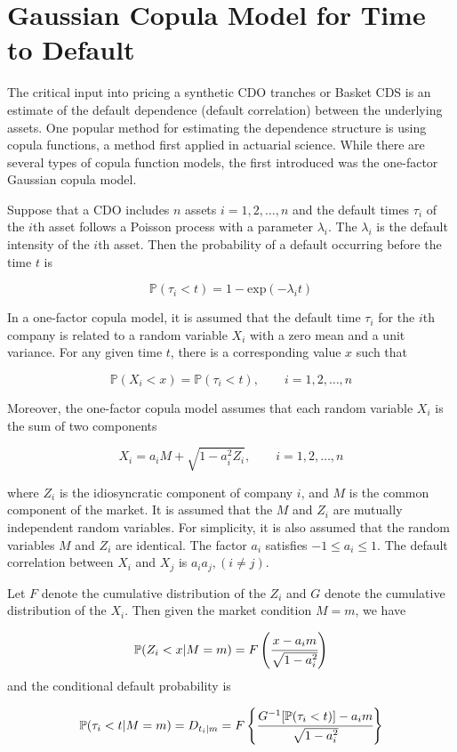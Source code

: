 \section{Gaussian Copula Model for Time to Default}
The critical input into pricing a synthetic CDO tranches or Basket CDS is an estimate of the default dependence (default correlation) between the underlying assets.
One popular method for estimating the dependence structure is using copula functions, a method first applied in actuarial science. While there are several types of copula function models, the first introduced was the one-factor Gaussian copula
model.

Suppose that a CDO includes $n$ assets $i = 1, 2,\ldots, n$ and the default times $\tau_i$ of
the $i$th asset follows a Poisson process with a parameter $\lambda_i$. The $\lambda_i$ is the default
intensity of the $i$th asset. Then the probability of a default occurring before the
time $t$ is

\[\mathbb{P}(\tau_i \lt t) = 1 - \mathrm{exp}(-\lambda_i t)\]

In a one-factor copula model, it is assumed that the default time $\tau_i$ for the $i$th
company is related to a random variable $X_i$ with a zero mean and a unit variance.
For any given time $t$, there is a corresponding value $x$ such that

\[\mathbb{P}(X_i < x) = \mathbb{P}(\tau_i < t),\qquad i = 1, 2,\ldots, n\]

Moreover, the one-factor copula model assumes that each random variable $X_i$ is the
sum of two components

\[X_i = a_i M + \sqrt{1-a_i^2 Z_i},\qquad i = 1, 2,\ldots, n\]

where $Z_i$ is the idiosyncratic component of company $i$, and $M$ is the common component of the market. It is assumed that the $M$ and $Z_i$ are mutually independent random variables. For simplicity, it is also assumed that the random variables $M$
and $Z_i$ are identical. The factor $a_i$ satisfies $-1 \le a_i \le 1$. The default correlation
between $X_i$ and $X_j$ is $a_i a_j,(i \ne j)$.

Let $F$ denote the cumulative distribution of the $Z_i$ and $G$ denote the cumulative distribution of the $X_i$. Then given the market condition $M = m$, we have

\[\mathbb{P}(Z_i < x|M = m) = F\left(\cfrac{x-a_i m}{\sqrt{1-a_i^2}}\right)\]
and the conditional default probability is

\[\mathbb{P}(\tau_i < t|M = m) = D_{t_i |m} = F\left\{\cfrac{G^{-1}[\mathbb{P}(\tau_i < t)] - a_i m}{\sqrt{1-a_i^2}}\right\}\]

